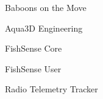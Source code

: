 \item Baboons on the Move
\item Aqua3D Engineering
\item FishSense Core
\item FishSense User
\item Radio Telemetry Tracker

